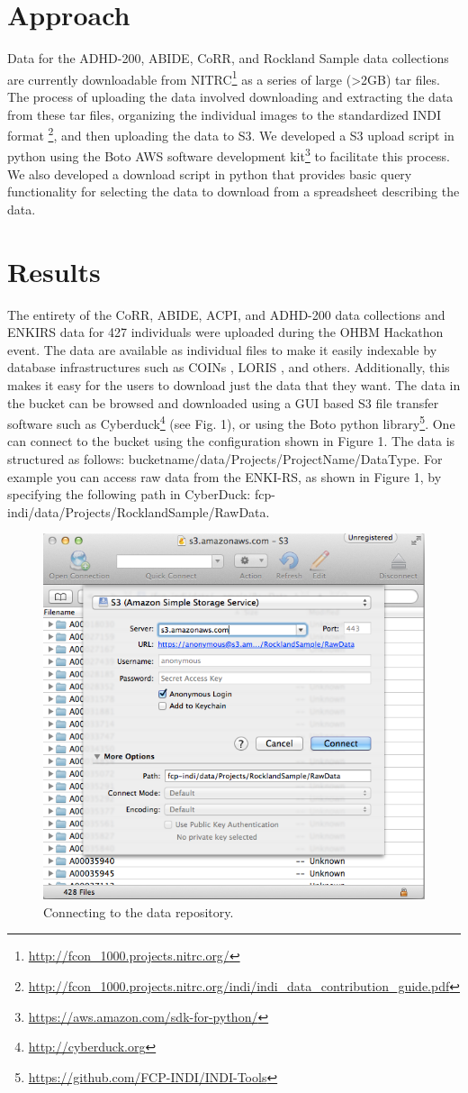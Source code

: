 \documentclass[twocolumn]{bmcart}%
\begin{document}
\section{Approach}\label{approach}

Data for the ADHD-200, ABIDE, CoRR, and Rockland Sample data collections
are currently downloadable from
NITRC\footnote{\url{http://fcon_1000.projects.nitrc.org/}} as a series
of large (\textgreater{}2GB) tar files. The process of uploading the
data involved downloading and extracting the data from these tar files,
organizing the individual images to the standardized INDI format
\footnote{\url{http://fcon_1000.projects.nitrc.org/indi/indi_data_contribution_guide.pdf}},
and then uploading the data to S3. We developed a S3 upload script in
python using the Boto AWS software development
kit\footnote{\url{https://aws.amazon.com/sdk-for-python/}} to facilitate
this process. We also developed a download script in python that
provides basic query functionality for selecting the data to download
from a spreadsheet describing the data.

\section{Results}\label{results}

The entirety of the CoRR, ABIDE, ACPI, and ADHD-200 data collections and
ENKIRS data for 427 individuals were uploaded during the OHBM Hackathon
event. The data are available as individual files to make it easily
indexable by database infrastructures such as COINs \cite{landis2016},
LORIS \cite{Das2011}, and others. Additionally, this makes it easy for
the users to download just the data that they want. The data in the
bucket can be browsed and downloaded using a GUI based S3 file transfer
software such as Cyberduck\footnote{\url{http://cyberduck.org}} (see
Fig. 1), or using the Boto python
library\footnote{\url{https://github.com/FCP-INDI/INDI-Tools}}. One can
connect to the bucket using the configuration shown in Figure 1. The
data is structured as follows:
bucketname/data/Projects/ProjectName/DataType. For example you can
access raw data from the ENKI-RS, as shown in Figure 1, by specifying
the following path in CyberDuck:
fcp-indi/data/Projects/RocklandSample/RawData.

\begin{figure}[h!]
  \includegraphics[width=.47\textwidth]{cyberduck_screenshot.png}
  \caption{\label{centfig} Connecting to the data repository.}
\end{figure}
\end{document}
